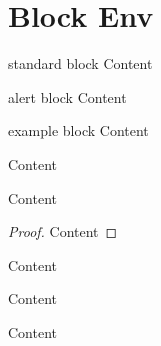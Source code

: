 
\section{Block Env}

\begin{frame}
  \begin{block}{standard block}
    Content
  \end{block}
  \begin{alertblock}{alert block}
    Content
  \end{alertblock}
  \begin{exampleblock}{example block}
    Content \cite{scharnowskifuzzware}
  \end{exampleblock}
\end{frame}

\begin{frame}
  \begin{theorem}
    Content
  \end{theorem}
  \begin{definition}
    Content
  \end{definition}
  \begin{proof}
    Content
  \end{proof}
  \begin{lemma}
    Content
  \end{lemma}
  \begin{corollary}
    Content
  \end{corollary}
  \begin{example}
    Content
  \end{example}
\end{frame}